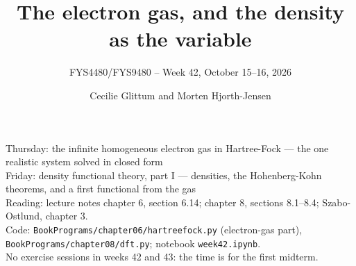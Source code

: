 \documentclass[aspectratio=169,10pt]{beamer}
\title{The electron gas, and the density as the variable}
\subtitle{FYS4480/FYS9480 -- Week 42, October 15--16, 2026}
\author{Cecilie Glittum and Morten Hjorth-Jensen}
\institute{Department of Physics,\\
University of Oslo, Norway}
\date{}
\begin{document}
\begin{frame}[plain]
  \vfill
  \begin{center}\small
  Thursday: the infinite homogeneous electron gas in Hartree-Fock --- the one realistic system solved in closed form\\
  Friday: density functional theory, part I --- densities, the Hohenberg-Kohn theorems, and a first functional from the gas\\[0.8em]
  {\footnotesize Reading: lecture notes chapter 6, section 6.14; chapter 8, sections 8.1--8.4; Szabo-Ostlund, chapter 3.\\
  Code: \texttt{BookPrograms/chapter06/hartreefock.py} (electron-gas part), \texttt{BookPrograms/chapter08/dft.py}; notebook \texttt{week42.ipynb}.\\[0.3em]
  \alert{No exercise sessions in weeks 42 and 43: the time is for the first midterm.}}
  \end{center}
\end{frame}
\end{document}
